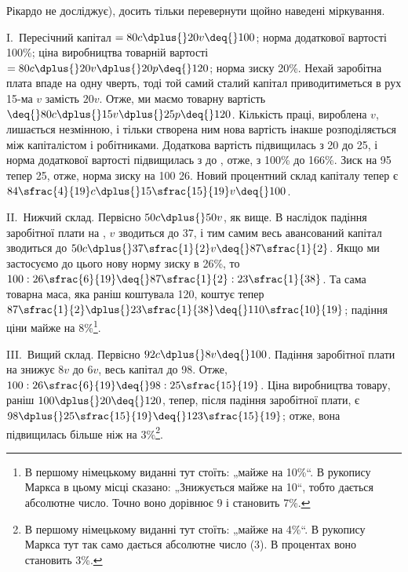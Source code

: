 \parcont{}  %
Рікардо не досліджує), досить тільки перевернути щойно наведені
міркування.

I.~Пересічний капітал $= 80 c \dplus{} 20 v \deq{} 100$; норма додаткової
вартості \deq{} 100\%; ціна виробництва \deq{} товарній вартості $= 80 c \dplus{}
20 v \dplus{} 20 p \deq{} 120$; норма зиску \deq{} 20\%. Нехай заробітна плата
впаде на одну чверть, тоді той самий сталий капітал приводитиметься
в рух 15-ма $v$ замість $20 v$. Отже, ми маємо товарну
вартість $ \deq{} 80 c \dplus{} 15 v \dplus{} 25 p \deq{} 120$. Кількість праці, вироблена $v$,
лишається  незмінною, і тільки створена ним нова вартість інакше
розподіляється між капіталістом і робітниками. Додаткова вартість
підвищилась з 20 до 25, і норма додаткової вартості
підвищилась з  до , отже, з 100\% до 166\%.
Зиск на 95 тепер \deq{} 25, отже, норма зиску на 100 \deq{} 26. Новий
процентний склад капіталу тепер є $84\sfrac{4}{19}c \dplus{} 15\sfrac{15}{19}v \deq{} 100$.

II.~Нижчий склад. Первісно $50 c \dplus{} 50 v$, як вище. В наслідок
падіння заробітної плати на , $v$ зводиться до 37, і тим самим
весь авансований капітал зводиться до $50 c \dplus{} 37\sfrac{1}{2}v \deq{} 87\sfrac{1}{2}$. Якщо
ми застосуємо до цього нову норму зиску в 26\%, то
$100 : 26\sfrac{6}{19} \deq{} 87\sfrac{1}{2} : 23\sfrac{1}{38}$. Та сама товарна маса,
яка раніш коштувала 120, коштує
тепер $87\sfrac{1}{2} \dplus{} 23\sfrac{1}{38} \deq{} 110\sfrac{10}{19}$; падіння ціни
майже на 8\%\footnote*{
В першому німецькому виданні тут стоїть: „майже на 10\%“. В рукопису
Маркса в цьому місці сказано: „Знижується майже на 10“, тобто дається абсолютне
число. Точно воно дорівнює 9 і становить 7\%. 
}.

III.~Вищий склад. Первісно $92 c \dplus{} 8 v \deq{} 100$. Падіння заробітної
плати на  знижує $8 v$ до $6 v$, весь капітал до 98. Отже,
$100 : 26\sfrac{6}{19} \deq{} 98 : 25\sfrac{15}{19}$. Ціна виробництва товару,
раніш $100 \dplus{} 20 \deq{} 120$, тепер, після падіння заробітної плати, є
$98 \dplus{} 25\sfrac{15}{19} \deq{} 123\sfrac{15}{19}$;
отже, вона підвищилась більше ніж на 3\%\footnote*{
В першому німецькому виданні тут стоїть: „майже на 4\%“. В рукопису
Маркса тут так само дається абсолютне число (3). В процентах воно
становить 3\%. 
}.

